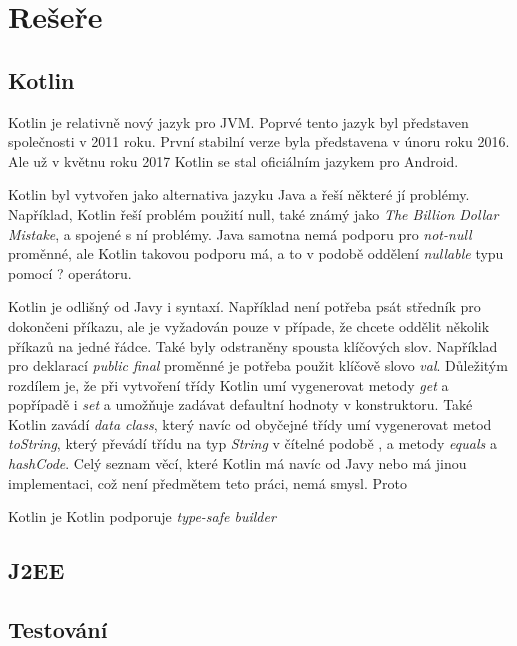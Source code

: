 \chapter{Rešeře}\label{resere}
\section{Kotlin}\label{resere:kotlin}
    Kotlin je relativně nový jazyk pro JVM. Poprvé tento jazyk byl představen společnosti v 2011 roku. První stabilní verze byla představena v únoru roku 2016. Ale už v květnu roku 2017 Kotlin se stal oficiálním jazykem pro Android.
    
    Kotlin byl vytvořen jako alternativa jazyku Java a řeší některé jí problémy. Například, Kotlin řeší problém použití null, také známý jako \textit{The Billion Dollar Mistake}\cite{theBDM}, a spojené s ní problémy. Java samotna nemá podporu pro \textit{not-null} proměnné, ale Kotlin takovou podporu má, a to v podobě oddělení \textit{nullable} typu pomocí ? operátoru.
    
    Kotlin je odlišný od Javy i syntaxí. Například není potřeba psát středník pro dokončeni příkazu, ale je vyžadován pouze v případe, že chcete oddělit několik příkazů na jedné řádce. Také byly odstraněny spousta klíčových slov. Například pro deklarací \textit{public final} proměnné je potřeba použit klíčově slovo \textit{val}. Důležitým rozdílem je, že při vytvoření třídy Kotlin umí vygenerovat metody \textit{get} a popřípadě i \textit{set} a umožňuje zadávat defaultní hodnoty v konstruktoru. Také Kotlin zavádí \textit{data class}, který navíc od obyčejné třídy umí vygenerovat metod \textit{toString}, který převádí třídu na typ \textit{String} v čítelné podobě \cite{Priklad vygenerovane tridy}, a metody \textit{equals} a \textit{hashCode}. Celý seznam věcí, které Kotlin má navíc od Javy nebo má jinou implementaci, což není předmětem teto práci, nemá smysl. Proto 
    
    
    Kotlin je Kotlin podporuje \textit{type-safe builder}
\section{J2EE}\label{resere:j2ee}
    
\section{Testování}\label{resere:testovani}